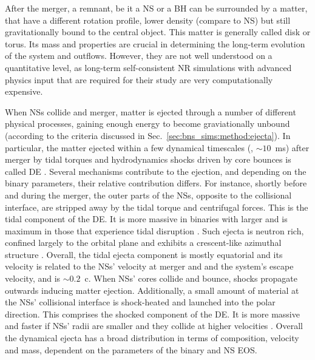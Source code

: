 After the merger, a remnant, be it a \ac{NS} or a \ac{BH} can be surrounded by a matter, that 
have a different rotation profile, lower density (compare to \ac{NS}) but still gravitationally 
bound to the central object. This matter is generally called disk or torus. Its mass and 
properties are crucial in determining the long-term evolution of the system and \pmerg{} 
outflows. However, they are not well understood on a quantitative level, as long-term 
self-consistent \ac{NR} simulations with advanced physics input that are required for their study 
are very computationally expensive. 

When \acp{NS} collide and merger, matter is ejected through a number of 
different physical processes, gaining enough energy to become graviationally 
unbound (according to the criteria discussed in Sec.~\ref{sec:bns_sims:method:ejecta}). 
In particular, the matter ejected within a few dynamical timescales (\ie, ${\sim}10$~ms) 
after merger by tidal torques and hydrodynamics shocks driven by core bounces 
is called \ac{DE} \citep[\eg][]{Hotokezaka:2013b,Bauswein:2013yna,Radice:2016dwd,Radice:2018pdn}. 
%
%
Several mechanisms contribute to the ejection, and depending on the 
binary parameters, their relative contribution differs.
%
For instance, shortly before and during the merger, the outer parts 
of the \acp{NS}, opposite to the collisional interface, are stripped 
away by the tidal torque and centrifugal forces. This is the tidal 
component of the \ac{DE}. It is more massive in binaries with 
larger \mr{} and is maximum in those that experience tidal disruption 
\citep[\eg][]{Radice:2018pdn,Bernuzzi:2020txg}.
%
Such ejecta is neutron rich, confined largely to the orbital plane and exhibits 
a crescent-like azimuthal structure \citep{Bernuzzi:2020txg}.
%
Overall, the tidal ejecta component is mostly equatorial and its 
velocity is related to the \acp{NS}' velocity at merger and 
and the system's escape velocity, and is $\sim0.2$~c.
%
When \acp{NS}' cores collide and bounce, shocks propagate outwards inducing 
matter ejection. Additionally, a small amount of material at the 
\acp{NS}' collisional interface is shock-heated and launched into the polar 
direction. This comprises the shocked component of the \ac{DE}.
%
It is more massive and faster if \acp{NS}' radii are smaller and they collide 
at higher velocities \citep[\eg][]{Radice:2018pdn}. 
%
Overall the dynamical ejecta has a broad distribution in terms of composition, 
velocity and mass, dependent on the parameters of the binary and \ac{NS} \ac{EOS}.

